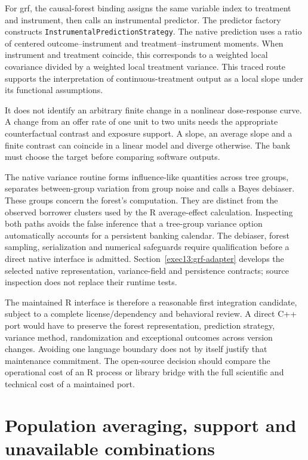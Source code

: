 For grf, the causal-forest binding assigns the same variable index to treatment
and instrument, then calls an instrumental predictor. The predictor factory
constructs \texttt{InstrumentalPredictionStrategy}. The native prediction uses
a ratio of centered outcome--instrument and treatment--instrument moments.
When instrument and treatment coincide, this corresponds to a weighted local
covariance divided by a weighted local treatment variance. This traced route
supports the interpretation of continuous-treatment output as a local slope
under its functional assumptions. \cite{v131_sw_grf}

It does not identify an arbitrary finite change in a nonlinear dose-response
curve. A change from an offer rate of one unit to two units needs the appropriate
counterfactual contrast and exposure support. A slope, an average slope and a
finite contrast can coincide in a linear model and diverge otherwise. The bank
must choose the target before comparing software outputs.

The native variance routine forms influence-like quantities across tree
groups, separates between-group variation from group noise and calls a Bayes
debiaser. These groups concern the forest's computation. They are distinct
from the observed borrower clusters used by the R average-effect calculation.
Inspecting both paths avoids the false inference that a tree-group variance
option automatically accounts for a persistent banking calendar. The debiaser,
forest sampling, serialization and numerical safeguards require qualification
before a direct native interface is admitted. Section~\ref{exec13:grf-adapter}
develops the selected native representation, variance-field and persistence
contracts; source inspection does not replace their runtime tests. \cite{v131_sw_grf}

The maintained R interface is therefore a reasonable first integration
candidate, subject to a complete license/dependency and behavioral review.
A direct C++ port would have to preserve the forest representation, prediction
strategy, variance method, randomization and exceptional outcomes across version
changes. Avoiding one language boundary does not by itself justify that
maintenance commitment. The open-source decision should compare the operational
cost of an R process or library bridge with the full scientific and technical
cost of a maintained port.

\section{Population averaging, support and unavailable combinations}

